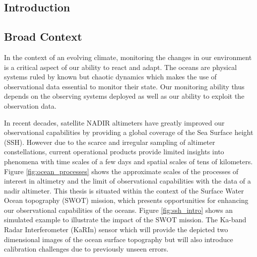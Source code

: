 \begin{bibunit}

\chapter{Introduction}




  \section{Broad Context}


In the context of an evolving climate, monitoring the changes in our environment is a critical aspect of our ability to react and adapt.
The oceans are physical systems ruled by known but chaotic dynamics which makes the use of observational data essential to monitor their state.
Our monitoring ability thus depends on the observing systems deployed as well as our ability to exploit the observation data.

In recent decades, satellite NADIR altimeters have greatly improved our observational capabilities by providing a global coverage of the Sea Surface height (SSH).
  However due to the scarce and irregular sampling of altimeter constellations, current operational products provide limited insights into phenomena with time scales of a few days and spatial scales of tens of kilometers\cite{ballarottaResolutionsOceanAltimetry2019}. Figure \ref{fig:ocean_processes} shows the approximate scales of the processes of interest in altimetry and the limit of observational capabilities with the data of a nadir altimeter.
  This thesis is situated within the context of the Surface Water Ocean topography (SWOT)\cite{KaRInSWOTCharacteristics} mission, which presents opportunities for enhancing our observational capabilities of the oceans. Figure \ref{fig:ssh_intro} shows an simulated example to illustrate the impact of the SWOT mission.
The Ka-band Radar Interferometer (KaRIn) sensor which will provide the depicted two dimensional images of the ocean surface topography but will also introduce calibration challenges\cite{EmpiricalCrossCalibrationCoherent} due to previously unseen errors.



\end{bibunit}
